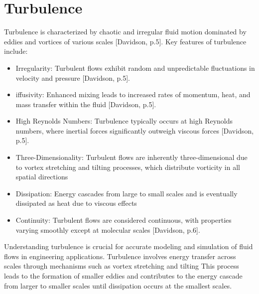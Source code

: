 \section{Turbulence}
Turbulence is characterized by chaotic and irregular fluid motion dominated by eddies and vortices of various scales [Davidson, p.5]. 
Key features of turbulence include:
\begin{itemize}
    \item Irregularity: Turbulent flows exhibit random and unpredictable fluctuations in velocity and pressure [Davidson, p.5].
    \item iffusivity: Enhanced mixing leads to increased rates of momentum, heat, and mass transfer within the fluid [Davidson, p.5].
    \item High Reynolds Numbers: Turbulence typically occurs at high Reynolds numbers, where inertial forces significantly outweigh viscous forces [Davidson, p.5].
    \item Three-Dimensionality: Turbulent flows are inherently three-dimensional due to vortex stretching and tilting processes, 
    which distribute vorticity in all spatial directions %
    \item Dissipation: Energy cascades from large to small scales and is eventually dissipated as heat due to viscous effects
    \item Continuity: Turbulent flows are considered continuous, with properties varying smoothly except at molecular scales [Davidson, p.6].
\end{itemize}
Understanding turbulence is crucial for accurate modeling and simulation of fluid flows in engineering applications. 
Turbulence involves energy transfer across scales through mechanisms such as vortex stretching and tilting %
This process leads to the formation of smaller eddies and contributes to the energy cascade from larger to smaller scales until dissipation
occurs at the smallest scales.

